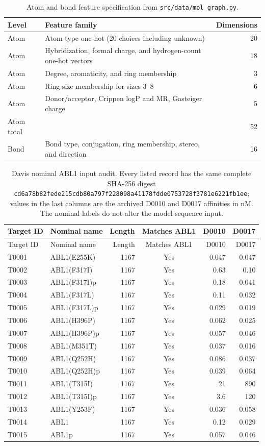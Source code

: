 \documentclass[11pt]{article}
\begin{document}
\begin{table}[H]
\centering
\caption{Atom and bond feature specification from \texttt{src/data/mol\_graph.py}.}
\begin{tabular}{llr}
\toprule
Level & Feature family & Dimensions \\
\midrule
Atom & Atom type one-hot (20 choices including unknown) & 20 \\
Atom & Hybridization, formal charge, and hydrogen-count one-hot vectors & 18 \\
Atom & Degree, aromaticity, and ring membership & 3 \\
Atom & Ring-size membership for sizes 3--8 & 6 \\
Atom & Donor/acceptor, Crippen logP and MR, Gasteiger charge & 5 \\
Atom total &  & 52 \\
Bond & Bond type, conjugation, ring membership, stereo, and direction & 16 \\
\bottomrule
\end{tabular}
\end{table}

\begin{longtable}{@{}l@{\quad}l@{\quad}r@{\quad}c@{\quad}r@{\quad}r@{}}
\caption{Davis nominal ABL1 input audit. Every listed record has the same complete SHA-256 digest {\scriptsize\texttt{cd6a78b82fede215cdb80a797f228098a41178fdde0753728f3781e6221fb1ee}}; values in the last columns are the archived D0010 and D0017 affinities in nM. The nominal labels do not alter the model sequence input.}\\
\toprule
Target ID & Nominal name & Length & Matches ABL1 & D0010 & D0017 \\
\midrule
\endfirsthead
\toprule
Target ID & Nominal name & Length & Matches ABL1 & D0010 & D0017 \\
\midrule
\endhead
T0001 & ABL1(E255K) & 1167 & Yes & 0.047 & 0.047 \\
T0002 & ABL1(F317I) & 1167 & Yes & 0.63 & 0.10 \\
T0003 & ABL1(F317I)p & 1167 & Yes & 0.18 & 0.041 \\
T0004 & ABL1(F317L) & 1167 & Yes & 0.11 & 0.032 \\
T0005 & ABL1(F317L)p & 1167 & Yes & 0.029 & 0.019 \\
T0006 & ABL1(H396P) & 1167 & Yes & 0.062 & 0.025 \\
T0007 & ABL1(H396P)p & 1167 & Yes & 0.057 & 0.046 \\
T0008 & ABL1(M351T) & 1167 & Yes & 0.037 & 0.016 \\
T0009 & ABL1(Q252H) & 1167 & Yes & 0.086 & 0.037 \\
T0010 & ABL1(Q252H)p & 1167 & Yes & 0.039 & 0.064 \\
T0011 & ABL1(T315I) & 1167 & Yes & 21 & 890 \\
T0012 & ABL1(T315I)p & 1167 & Yes & 3.6 & 120 \\
T0013 & ABL1(Y253F) & 1167 & Yes & 0.036 & 0.058 \\
T0014 & ABL1 & 1167 & Yes & 0.12 & 0.029 \\
T0015 & ABL1p & 1167 & Yes & 0.057 & 0.046 \\
\bottomrule
\end{longtable}
\end{document}
